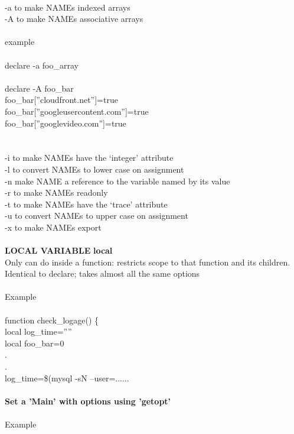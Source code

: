 \documentclass[10pt,a4paper]{article}
\begin{document}
{{{{{{{{{{{{{{{{{{{   \\
      -a        to make NAMEs indexed arrays\\
      -A        to make NAMEs associative arrays \\
\\
example \\
\\
	declare -a foo\_array\\
\\
	declare -A foo\_bar\\
	foo\_bar[''cloudfront.net'']=true\\
	foo\_bar[''googleusercontent.com'']=true\\
	foo\_bar[''googlevideo.com'']=true\\
\\
\\
      -i        to make NAMEs have the `integer' attribute\\
      -l        to convert NAMEs to lower case on assignment\\
      -n        make NAME a reference to the variable named by its value\\
      -r        to make NAMEs readonly\\
      -t        to make NAMEs have the `trace' attribute\\
      -u        to convert NAMEs to upper case on assignment\\
      -x        to make NAMEs export\\
    \\
\textbf{LOCAL VARIABLE}\textbf{  local}\\
Only can do inside a function: restricts scope to that function and its children.\\
Identical to declare; takes almost all the same options\\
\\
Example\\
\\
function check\_logage() \{\\
  local log\_time=''''\\
  local foo\_bar=0\\
  .\\
  .\\
  log\_time=\$(mysql -sN --user=......\\
\\
\textbf{Set a 'Main' with options using 'getopt'}\\
\\
Example\\
}}}}}}}}}}}}}}}}}}}
\end{document}
